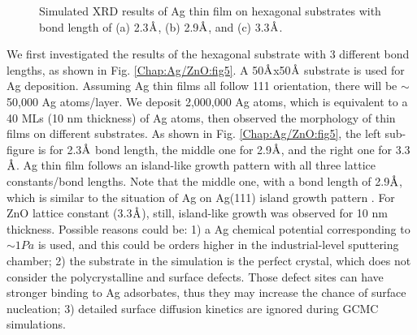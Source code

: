 \begingroup
\begin{figure}[!ht]
  \centering
  \label{Chap:Ag/ZnO:fig:6a}
  \label{Chap:Ag/ZnO:fig:6b}
  \label{Chap:Ag/ZnO:fig:6c}
\caption[Simulated XRD results of Ag thin film on hexagonal substrates.]{Simulated \ac{XRD} results of Ag thin film on hexagonal substrates with bond length of (a) 2.3$\mbox{\normalfont\AA}$, (b) 2.9$\mbox{\normalfont\AA}$, and (c) 3.3$\mbox{\normalfont\AA}$.}
  \label{Chap:Ag/ZnO:fig6}
\end{figure}
\endgroup

We first investigated the results of the hexagonal substrate with 3 different bond lengths, as shown in Fig. \ref{Chap:Ag/ZnO:fig5}. A 50$\mbox{\normalfont\AA}$x50$\mbox{\normalfont\AA}$ substrate is used for Ag deposition. Assuming Ag thin films all follow {111} orientation, there will be $\sim$ 50,000 Ag atoms/layer. We deposit 2,000,000 Ag atoms, which is equivalent to a 40 \ac{ML}s (10 nm thickness) of Ag atoms, then observed the morphology of thin films on different substrates. As shown in Fig. \ref{Chap:Ag/ZnO:fig5}, the left sub-figure is for 2.3$\mbox{\normalfont\AA}$ bond length, the middle one for 2.9$\mbox{\normalfont\AA}$, and the right one for 3.3$\mbox{\normalfont\AA}$. Ag thin film follows an island-like growth pattern with all three lattice constants/bond lengths. Note that the middle one, with a bond length of 2.9$\mbox{\normalfont\AA}$, which is similar to the situation of Ag on Ag(111) island growth pattern \cite{li2008exploration}. For ZnO lattice constant (3.3$\mbox{\normalfont\AA}$), still, island-like growth was observed for 10 nm thickness. Possible reasons could be: 1) a Ag chemical potential corresponding to $\sim 1 Pa$ is used, and this could be orders higher in the industrial-level sputtering chamber; 2) the substrate in the simulation is the perfect crystal, which does not consider the polycrystalline and surface defects. Those defect sites can have stronger binding to Ag adsorbates, thus they may increase the chance of surface nucleation; 3) detailed surface diffusion kinetics are ignored during \ac{GCMC} simulations.

